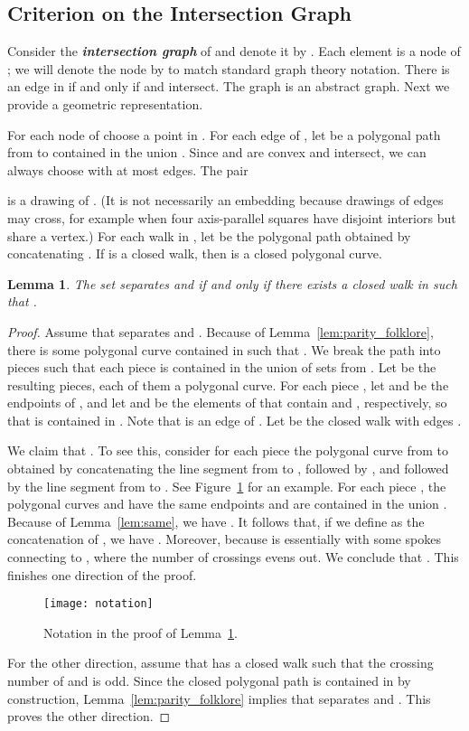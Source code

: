 \documentclass[a4paper,11pt]{article}
\def\DEF#1{\textbf{\emph{#1}}}
\newtheorem{lemma}[theorem]{Lemma}
\begin{document}
\subsection{Criterion on the Intersection Graph} 
\label{sec:intersection}

Consider the \DEF{intersection graph} of  and denote it by .
Each element  is a node of ; we will denote the node by  to 
match standard graph theory notation.
There is an edge  in  if and only if  and  intersect. 
The graph  is an abstract graph. 
Next we provide a geometric representation.

For each node  of  choose a point  in . 
For each edge  of , let  be a polygonal path from  to 
contained in the union . Since  and  are convex and intersect, 
we can always choose  with at most  edges.
The pair 
 
is a drawing of .
(It is not necessarily an embedding because drawings of edges may cross, for example when four 
axis-parallel squares have disjoint interiors but share a vertex.)
For each walk  in , let  be the polygonal path obtained
by concatenating . 
If  is a closed walk, then  is a closed polygonal curve.

\begin{lemma}
\label{lem:nerve}
	The set  separates  and  if and only if
	there exists a closed walk  in  such that .
\end{lemma}
\begin{proof}
	Assume that  separates  and .
	Because of Lemma~\ref{lem:parity_folklore}, 
	there is some polygonal curve  contained in  such that . 
	We break the path  into pieces such that each piece is contained
	in the union of  sets from .
	Let  be the resulting pieces, each of them a polygonal curve. 
	For each piece , let  and  be the endpoints
	of , and let  and  be the elements of  that contain  and ,
	respectively, so that  is contained in .
	Note that  is an edge of . 
	Let  be the closed walk with edges .
	
	We claim that . 
	To see this, consider for each piece  the polygonal curve 
	 from  to  obtained by concatenating 
	the line segment from  to , 
	followed by , 
	and followed by the line segment from  to . 
	See Figure~\ref{fig:notation} for an example.
	For each piece , the polygonal curves  and  have the same
	endpoints and are contained in the union .
	Because of Lemma~\ref{lem:same}, we have
	.
	It follows that, if we define  as the concatenation of ,
	we have . 
	Moreover, 
	because  is essentially  with some spokes connecting  to ,
	where the number of crossings evens out.
	We conclude that .
	This finishes one direction of the proof.
	
	\begin{figure}[thb]
	\centering
		\texttt{[image: notation]}
		\caption{Notation in the proof of Lemma~\ref{lem:nerve}.}
		\label{fig:notation}
	\end{figure}

	For the other direction, assume that  has a closed walk  such that the crossing
	number of  and  is odd. Since the closed polygonal path
	 is contained in  by
	construction, Lemma~\ref{lem:parity_folklore} implies that  separates  and .
	This proves the other direction.
\end{proof}
\end{document}
